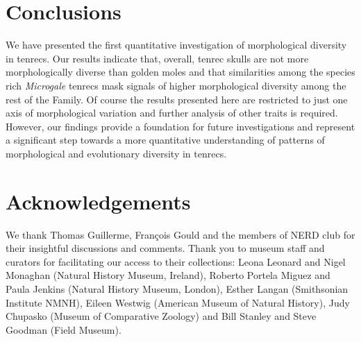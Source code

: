 \documentclass[12pt,a4paper]{article}
\begin{document}
\section{Conclusions}
	We have presented the first quantitative investigation of morphological diversity in tenrecs. Our results indicate that, overall, tenrec skulls are not more morphologically diverse than golden moles and that similarities among the species rich \textit{Microgale} tenrecs mask signals of higher morphological diversity among the rest of the Family. Of course the results presented here are restricted to just one axis of morphological variation and further analysis of other traits is required. However, our findings provide a foundation for future investigations and represent a significant step towards a more quantitative understanding of patterns of morphological and evolutionary diversity in tenrecs. 
\section{Acknowledgements} %
	We thank Thomas Guillerme, Fran\c{c}ois Gould and the members of NERD club for their insightful discussions and comments. Thank you to museum staff and curators for facilitating our access to their collections: Leona Leonard and Nigel Monaghan (Natural History Museum, Ireland), Roberto Portela Miguez and Paula Jenkins (Natural History Museum, London), Esther Langan (Smithsonian Institute NMNH), Eileen Westwig (American Museum of Natural History), Judy Chupasko (Museum of Comparative Zoology) and Bill Stanley and Steve Goodman (Field Museum).
 
 
\end{document}
